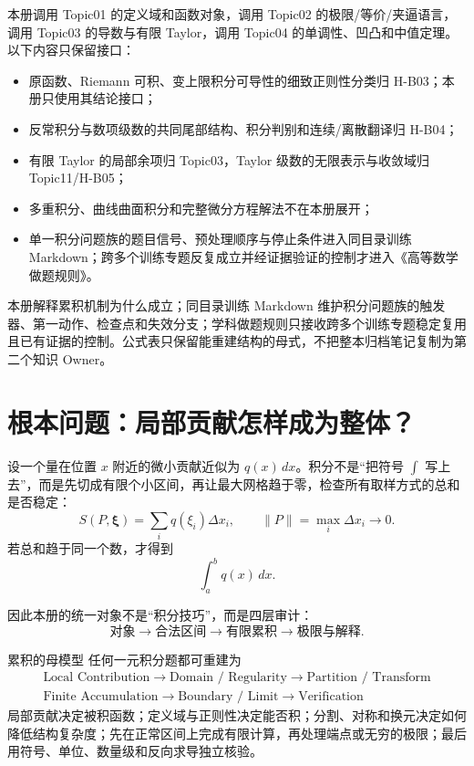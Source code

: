 \documentclass[11pt,a4paper,fontset=fandol]{ctexart}
\begin{document}
本册调用 Topic01 的定义域和函数对象，调用 Topic02 的极限/等价/夹逼语言，调用 Topic03 的导数与有限 Taylor，调用 Topic04 的单调性、凹凸和中值定理。以下内容只保留接口：
\begin{itemize}
  \item 原函数、Riemann 可积、变上限积分可导性的细致正则性分类归 H-B03；本册只使用其结论接口；
  \item 反常积分与数项级数的共同尾部结构、积分判别和连续/离散翻译归 H-B04；
  \item 有限 Taylor 的局部余项归 Topic03，Taylor 级数的无限表示与收敛域归 Topic11/H-B05；
  \item 多重积分、曲线曲面积分和完整微分方程解法不在本册展开；
  \item 单一积分问题族的题目信号、预处理顺序与停止条件进入同目录训练 Markdown；跨多个训练专题反复成立并经证据验证的控制才进入《高等数学做题规则》。
\end{itemize}

本册解释累积机制为什么成立；同目录训练 Markdown 维护积分问题族的触发器、第一动作、检查点和失效分支；学科做题规则只接收跨多个训练专题稳定复用且已有证据的控制。公式表只保留能重建结构的母式，不把整本归档笔记复制为第二个知识 Owner。

\section{根本问题：局部贡献怎样成为整体？}

设一个量在位置 $x$ 附近的微小贡献近似为 $q(x)\,dx$。积分不是“把符号 $\int$ 写上去”，而是先切成有限个小区间，再让最大网格趋于零，检查所有取样方式的总和是否稳定：
\[
S(P,\boldsymbol\xi)=\sum_i q(\xi_i)\Delta x_i,
\qquad \lVert P\rVert=\max_i\Delta x_i\to0.
\]
若总和趋于同一个数，才得到
\[
\int_a^b q(x)\,dx.
\]

因此本册的统一对象不是“积分技巧”，而是四层审计：
\[
\boxed{\text{对象} \to \text{合法区间} \to \text{有限累积} \to \text{极限与解释}}.
\]

\begin{corebox}{累积的母模型}
任何一元积分题都可重建为
\[
\boxed{\begin{gathered}
\text{Local Contribution}
\to\text{Domain / Regularity}
\to\text{Partition / Transform}\\
\text{Finite Accumulation}
\to\text{Boundary / Limit}
\to\text{Verification}
\end{gathered}}
\]
局部贡献决定被积函数；定义域与正则性决定能否积；分割、对称和换元决定如何降低结构复杂度；先在正常区间上完成有限计算，再处理端点或无穷的极限；最后用符号、单位、数量级和反向求导独立核验。
\end{corebox}
\end{document}
